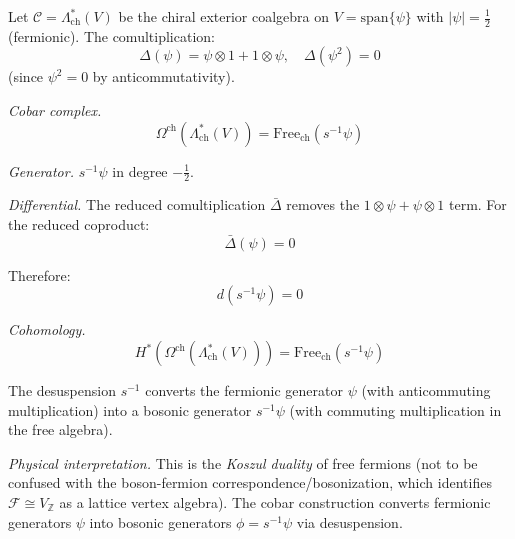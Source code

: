 \begin{example}\label{ex:cobar-fermion-complete}

Let $\mathcal{C} = \Lambda^*_{\text{ch}}(V)$ be the chiral exterior coalgebra on 
$V = \text{span}\{\psi\}$ with $|\psi| = \frac{1}{2}$ (fermionic). The comultiplication:
\[\Delta(\psi) = \psi \otimes 1 + 1 \otimes \psi, \quad \Delta(\psi^2) = 0\]
(since $\psi^2 = 0$ by anticommutativity).

\emph{Cobar complex.}
\[\Omega^{\text{ch}}(\Lambda^*_{\text{ch}}(V)) = \text{Free}_{\text{ch}}(s^{-1}\psi)\]

\emph{Generator.} $s^{-1}\psi$ in degree $-\frac{1}{2}$.

\emph{Differential.}
The reduced comultiplication $\bar{\Delta}$ removes the $1 \otimes \psi + \psi \otimes 1$ 
term. For the reduced coproduct:
\[\bar{\Delta}(\psi) = 0\]

Therefore:
\[d(s^{-1}\psi) = 0\]

\emph{Cohomology.}
\[H^*(\Omega^{\text{ch}}(\Lambda^*_{\text{ch}}(V))) = \text{Free}_{\text{ch}}(s^{-1}\psi)\]

The desuspension $s^{-1}$ converts the fermionic generator $\psi$ (with 
anticommuting multiplication) into a bosonic generator $s^{-1}\psi$ (with commuting 
multiplication in the free algebra).

\emph{Physical interpretation.} This is the \emph{Koszul duality} of free fermions (not to be confused with the boson-fermion correspondence/bosonization, which identifies $\mathcal{F} \cong V_{\mathbb{Z}}$ as a lattice vertex algebra).
The cobar construction converts fermionic generators $\psi$ into bosonic generators $\phi = s^{-1}\psi$ via desuspension.
\end{example}

